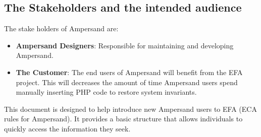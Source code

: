  \subsection{The Stakeholders and the intended audience}\label{sec:Stakeholders}
The stake holders of Ampersand are:

\begin{itemize}
	\item \textbf{Ampersand Designers}: Responsible for maintaining and developing Ampersand.
	\item \textbf{The Customer}: The end users of Ampersand will benefit from the EFA project. This will decreases the amount of time 
Ampersand users spend manually inserting PHP code to restore system invariants. 
\end{itemize}

This document is designed to help introduce new Ampersand users to EFA 
(ECA rules for Ampersand). It provides a basic structure that allows 
individuals to quickly access the information they seek. 
